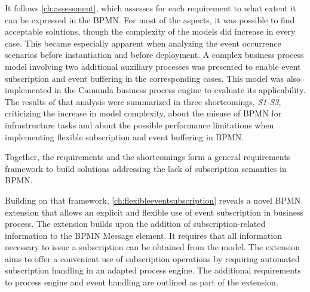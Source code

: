 It follows \autoref{ch:assessment}, which assesses for each requirement to what extent it can be expressed in the BPMN.
For most of the aspects, it was possible to find acceptable solutions, though the complexity of the models did increase in every case.
This became especially apparent when analyzing the event occurrence scenarios before instantiation and before deployment. A complex business process model involving two additional auxiliary processes was presented to enable event subscription and event buffering in the corresponding cases. This model was also implemented in the Camunda business process engine to evaluate its applicability.
The results of that analysis were summarized in three shortcomings, \textit{S1-S3}, criticizing the increase in model complexity, about the misuse of BPMN for infrastructure tasks and about the possible performance limitations when implementing flexible subscription and event buffering in BPMN.

Together, the requirements and the shortcomings form a general requirements framework to build solutions addressing the lack of subscription semantics in BPMN.


Building on that framework, \autoref{ch:flexibleeventsubscription} reveals a novel BPMN extension that allows an explicit and flexible use of event subscription in business process.
The extension builds upon the addition of subscription-related information to the BPMN Message element. It requires that all information necessary to issue a subscription can be obtained from the model.
The extension aims to offer a convenient use of subscription operations by requiring automated subscription handling in an adapted process engine.
The additional requirements to process engine and event handling are outlined as part of the extension.

